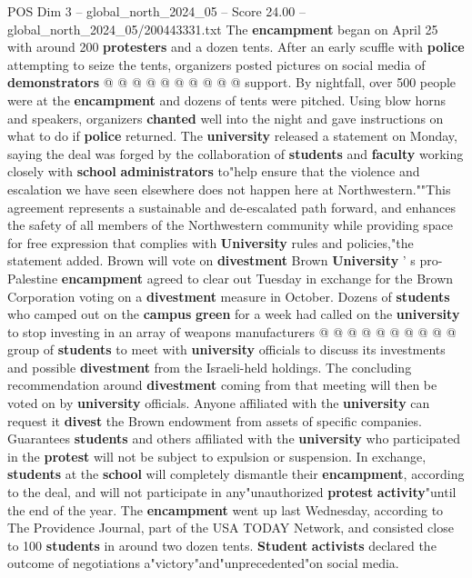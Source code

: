 \begin{textsample}{POS Dim 3 – global\_north\_2024\_05 – Score 24.00 – global\_north\_2024\_05/200443331.txt}
The \textbf{encampment} began on April 25 with around 200 \textbf{protesters} and a dozen tents.
After an early scuffle with \textbf{police} attempting to seize the tents, organizers posted pictures on social media of \textbf{demonstrators} @ @ @ @ @ @ @ @ @ @ support.
By nightfall, over 500 people were at the \textbf{encampment} and dozens of tents were pitched.
Using blow horns and speakers, organizers \textbf{chanted} well into the night and gave instructions on what to do if \textbf{police} returned.
The \textbf{university} released a statement on Monday, saying the deal was forged by the collaboration of \textbf{students} and \textbf{faculty} working closely with \textbf{school} \textbf{administrators} to"help ensure that the violence and escalation we have seen elsewhere does not happen here at Northwestern.""This agreement represents a sustainable and de-escalated path forward, and enhances the safety of all members of the Northwestern community while providing space for free expression that complies with \textbf{University} rules and policies,"the statement added.
Brown will vote on \textbf{divestment} Brown \textbf{University} ' s pro-Palestine \textbf{encampment} agreed to clear out Tuesday in exchange for the Brown Corporation voting on a \textbf{divestment} measure in October.
Dozens of \textbf{students} who camped out on the \textbf{campus} \textbf{green} for a week had called on the \textbf{university} to stop investing in an array of weapons manufacturers @ @ @ @ @ @ @ @ @ @ group of \textbf{students} to meet with \textbf{university} officials to discuss its investments and possible \textbf{divestment} from the Israeli-held holdings.
The concluding recommendation around \textbf{divestment} coming from that meeting will then be voted on by \textbf{university} officials.
Anyone affiliated with the \textbf{university} can request it \textbf{divest} the Brown endowment from assets of specific companies.
Guarantees \textbf{students} and others affiliated with the \textbf{university} who participated in the \textbf{protest} will not be subject to expulsion or suspension.
In exchange, \textbf{students} at the \textbf{school} will completely dismantle their \textbf{encampment}, according to the deal, and will not participate in any"unauthorized \textbf{protest} \textbf{activity}"until the end of the year.
The \textbf{encampment} went up last Wednesday, according to The Providence Journal, part of the USA TODAY Network, and consisted close to 100 \textbf{students} in around two dozen tents. \textbf{Student} \textbf{activists} declared the outcome of negotiations a"victory"and"unprecedented"on social media.

\end{textsample}
